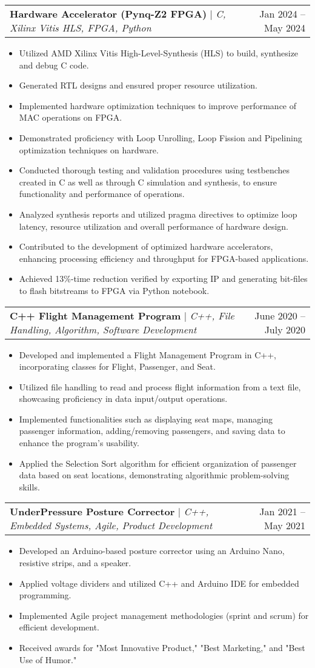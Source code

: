 \documentclass[A4,10pt]{article}
\makeatletter
\newcommand{\resumeItem}[1]{
  \item\small{
    {#1 \vspace{-2pt}}
  }
}
\newcommand{\resumeProjectHeading}[2]{
    \item
    \begin{tabular*}{0.97\textwidth}{l@{\extracolsep{\fill}}r}
      \small#1 & #2 \\
    \end{tabular*}\vspace{-7pt}
}
\newcommand{\resumeItemListStart}{\begin{itemize}}
\newcommand{\resumeItemListEnd}{\end{itemize}\vspace{-5pt}}
\makeatother
\begin{document}
        \resumeProjectHeading
        {\textbf{Hardware Accelerator (Pynq-Z2 FPGA)} $|$ \emph{C, Xilinx Vitis HLS, FPGA, Python}}{Jan 2024 -- May 2024}
        \resumeItemListStart
          \resumeItem{Utilized AMD Xilinx Vitis High-Level-Synthesis (HLS) to build, synthesize and debug C code.}
          \resumeItem{Generated RTL designs and ensured proper resource utilization.}
          \resumeItem{Implemented hardware optimization techniques to improve performance of MAC operations on FPGA.}
          \resumeItem{Demonstrated proficiency with Loop Unrolling, Loop Fission and Pipelining optimization techniques on hardware.}
          \resumeItem{Conducted thorough testing and validation procedures using testbenches created in C as well as through C simulation and synthesis, to ensure functionality and performance of operations.}
          \resumeItem{Analyzed synthesis reports and utilized pragma directives to optimize loop latency, resource utilization and overall performance of hardware design.}
          \resumeItem{Contributed to the development of optimized hardware accelerators, enhancing processing efficiency and throughput for FPGA-based applications.}
          \resumeItem{Achieved 13\%-time reduction verified by exporting IP and generating bit-files to flash bitstreams to FPGA via Python notebook.}
        \resumeItemListEnd

        \resumeProjectHeading
        {\textbf{C++ Flight Management Program} $|$ \emph{C++, File Handling, Algorithm, Software Development}}{June 2020 -- July 2020}
        \resumeItemListStart
          \resumeItem{Developed and implemented a Flight Management Program in C++, incorporating classes for Flight, Passenger, and Seat.}
          \resumeItem{Utilized file handling to read and process flight information from a text file, showcasing proficiency in data input/output operations.}
          \resumeItem{Implemented functionalities such as displaying seat maps, managing passenger information, adding/removing passengers, and saving data to enhance the program's usability.}
          \resumeItem{Applied the Selection Sort algorithm for efficient organization of passenger data based on seat locations, demonstrating algorithmic problem-solving skills.}
        \resumeItemListEnd
  
        \resumeProjectHeading
        {\textbf{UnderPressure Posture Corrector} $|$ \emph{C++, Embedded Systems, Agile, Product Development}}{Jan 2021 -- May 2021}
        \resumeItemListStart
          \resumeItem{Developed an Arduino-based posture corrector using an Arduino Nano, resistive strips, and a speaker.}
          \resumeItem{Applied voltage dividers and utilized C++ and Arduino IDE for embedded programming.}
          \resumeItem{Implemented Agile project management methodologies (sprint and scrum) for efficient development.}
          \resumeItem{Received awards for "Most Innovative Product," "Best Marketing," and "Best Use of Humor."}
        \resumeItemListEnd
  
\end{document}
